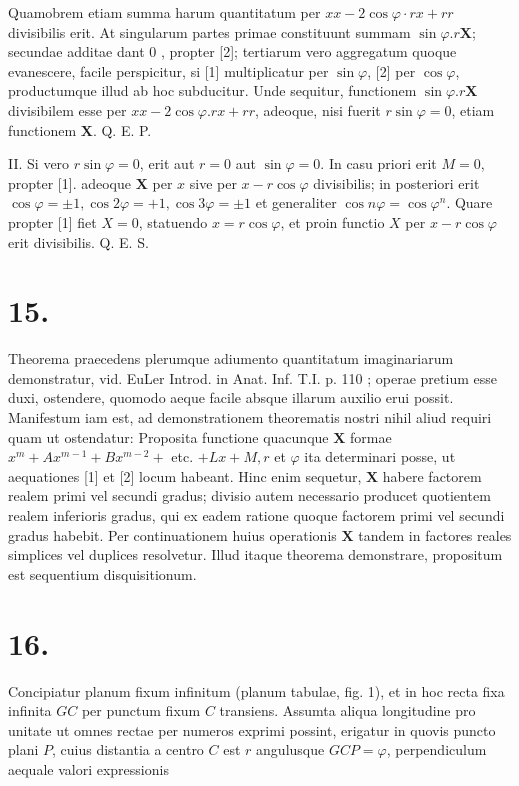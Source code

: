 \documentclass[10pt]{article}
\begin{document}
Quamobrem etiam summa harum quantitatum per \(x x-2 \cos \varphi \cdot r x+r r\) divisibilis erit. At singularum partes primae constituunt summam \(\sin \varphi . r \mathbf{X}\); secundae additae dant 0 , propter [2]; tertiarum vero aggregatum quoque evanescere, facile perspicitur, si [1] multiplicatur per \(\sin \varphi\), [2] per \(\cos \varphi\), productumque illud ab hoc subducitur. Unde sequitur, functionem \(\sin \varphi . r \boldsymbol{X}\) divisibilem esse per \(x x-2 \cos \varphi . r x+r r\), adeoque, nisi fuerit \(r \sin \varphi=0\), etiam functionem \(\boldsymbol{X}\). Q. E. P.

II. Si vero \(r \sin \varphi=0\), erit aut \(r=0\) aut \(\sin \varphi=0\). In casu priori erit \(M=0\), propter [1]. adeoque \(\boldsymbol{X}\) per \(x\) sive per \(x-r \cos \varphi\) divisibilis; in posteriori erit \(\cos \varphi= \pm 1, \cos 2 \varphi=+1, \cos 3 \varphi= \pm 1\) et generaliter \(\cos n \varphi=\cos \varphi^{n}\). Quare propter [1] fiet \(X=0\), statuendo \(x=r \cos \varphi\), et proin functio \(X\) per \(x-r \cos \varphi\) erit divisibilis. Q. E. S.

\section*{15.}
Theorema praecedens plerumque adiumento quantitatum imaginariarum demonstratur, vid. EuLer Introd. in Anat. Inf. T.I. p. 110 ; operae pretium esse duxi, ostendere, quomodo aeque facile absque illarum auxilio erui possit. Manifestum iam est, ad demonstrationem theorematis nostri nihil aliud requiri quam ut ostendatur: Proposita functione quacunque \(\boldsymbol{X}\) formae \(x^{m}+A x^{m-1}+B x^{m-2}+\) etc. \(+L x+M, r\) et \(\varphi\) ita determinari posse, ut aequationes [1] et [2] locum habeant. Hinc enim sequetur, \(\boldsymbol{X}\) habere factorem realem primi vel secundi gradus; divisio autem necessario producet quotientem realem inferioris gradus, qui ex eadem ratione quoque factorem primi vel secundi gradus habebit. Per continuationem huius operationis \(\boldsymbol{X}\) tandem in factores reales simplices vel duplices resolvetur. Illud itaque theorema demonstrare, propositum est sequentium disquisitionum.

\section*{16.}
Concipiatur planum fixum infinitum (planum tabulae, fig. 1), et in hoc recta fixa infinita \(G C\) per punctum fixum \(C\) transiens. Assumta aliqua longitudine pro unitate ut omnes rectae per numeros exprimi possint, erigatur in quovis puncto plani \(P\), cuius distantia a centro \(C\) est \(r\) angulusque \(G C P=\varphi\), perpendiculum aequale valori expressionis
\end{document}
